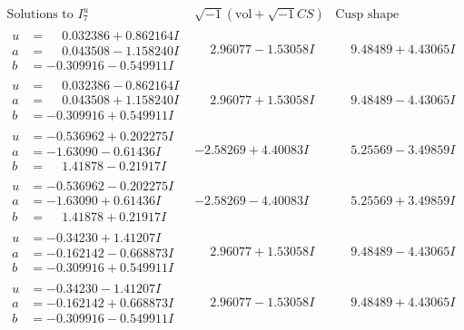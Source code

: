\documentclass[1p]{elsarticle_modified}
\theoremstyle{definition}
\newcommand{\I}{\sqrt{-1}}
\begin{document}
$$\begin{array}{c|c|c}  
\text{Solutions to }I^u_{7}& \I (\text{vol} + \sqrt{-1}CS) & \text{Cusp shape}\\
 \hline 
\begin{aligned}
u &= \phantom{-}0.032386 + 0.862164 I \\
a &= \phantom{-}0.043508 - 1.158240 I \\
b &= -0.309916 - 0.549911 I\end{aligned}
 & \phantom{-}2.96077 - 1.53058 I & \phantom{-}9.48489 + 4.43065 I \\ \hline\begin{aligned}
u &= \phantom{-}0.032386 - 0.862164 I \\
a &= \phantom{-}0.043508 + 1.158240 I \\
b &= -0.309916 + 0.549911 I\end{aligned}
 & \phantom{-}2.96077 + 1.53058 I & \phantom{-}9.48489 - 4.43065 I \\ \hline\begin{aligned}
u &= -0.536962 + 0.202275 I \\
a &= -1.63090 - 0.61436 I \\
b &= \phantom{-}1.41878 - 0.21917 I\end{aligned}
 & -2.58269 + 4.40083 I & \phantom{-}5.25569 - 3.49859 I \\ \hline\begin{aligned}
u &= -0.536962 - 0.202275 I \\
a &= -1.63090 + 0.61436 I \\
b &= \phantom{-}1.41878 + 0.21917 I\end{aligned}
 & -2.58269 - 4.40083 I & \phantom{-}5.25569 + 3.49859 I \\ \hline\begin{aligned}
u &= -0.34230 + 1.41207 I \\
a &= -0.162142 - 0.668873 I \\
b &= -0.309916 + 0.549911 I\end{aligned}
 & \phantom{-}2.96077 + 1.53058 I & \phantom{-}9.48489 - 4.43065 I \\ \hline\begin{aligned}
u &= -0.34230 - 1.41207 I \\
a &= -0.162142 + 0.668873 I \\
b &= -0.309916 - 0.549911 I\end{aligned}
 & \phantom{-}2.96077 - 1.53058 I & \phantom{-}9.48489 + 4.43065 I \\ \hline\begin{aligned}

\end{aligned}
\end{array}$$
\end{document}
